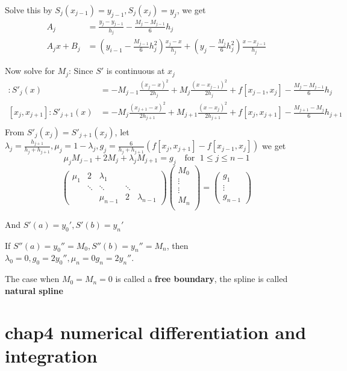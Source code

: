 \documentclass[11pt]{article}
\begin{document}
Solve this by \(S_j(x_{j-1})=y_{j-1},S_j(x_j)=y_j\), we get
\begin{align*}
A_j&=\frac{y_j-y_{j-1}}{h_j}-\frac{M_j-M_{j-1}}{6}h_j\\
A_jx+B_j&=(y_{i-1}-\frac{M_{j-1}}{6}h_j^2)\frac{x_j-x}{h_j}+ 
(y_j-\frac{M_j}{6}h_j^2)\frac{x-x_{j-1}}{h_j}
\end{align*}

Now solve for \(M_j\): Since \(S'\) is continuous at \(x_j\)
 \begin{align*}
[x_{j-1},x_j]:S'_j(x)&=-M_{j-1}\frac{(x_j-x)^2}{2h_j}+M_j\frac{(x-x_{j-1})^2}{2h_j}
                       +f[x_{j-1},x_j]-\frac{M_j-M_{j-1}}{6}h_j\\
[x_j,x_{j+1}]:S'_{j+1}(x)&=-M_j\frac{(x_{j+1}-x)^2}{2h_{j+1}}+M_{j+1}
\frac{(x-x_j)^2}{2h_{j+1}}+f[x_j,x_{j+1}]-\frac{M_{j+1}-M_j}{6}h_{j+1}\\
\end{align*}
From \(S'_j(x_j)=S'_{j+1}(x_j)\), let \(\lambda_j=\frac{h_{j+1}}{h_j+h_{j+1}},
   \mu_j=1-\lambda_j,g_j=\frac{6}{h_j+h_{j+1}}(f[x_j,x_{j+1}]-f[x_{j-1},x_j])\)
we get
\begin{equation*}
\mu_jM_{j-1}+2M_j+\lambda_jM_{j+1}=g_j\quad\text{for } \;1\le j\le n-1
\end{equation*}
\begin{equation*}
\begin{pmatrix}
\mu_1 & 2 & \lambda_1 &&\\
& \ddots &\ddots &\ddots &\\
&&\mu_{n-1}&2&\lambda_{n-1}
\end{pmatrix}
\begin{pmatrix}
M_0\\
\vdots\\
\vdots\\
M_n\\
\end{pmatrix}=
\begin{pmatrix}
g_1\\
\vdots\\
g_{n-1}
\end{pmatrix}
\end{equation*}

And  \(S'(a)=y_0',S'(b)=y_n'\)

If \(S''(a)=y_0''=M_0,S''(b)=y_n''=M_n\), then \(\lambda_0=0,g_0=2y_0'',\mu_n=0
   g_n=2y_n''\).

The case when \(M_0=M_n=0\) is called a \textbf{free boundary}, the spline is called
\textbf{natural spline}
\section{chap4 numerical differentiation and integration}
\label{sec:orgb0ab52d}
\end{document}
